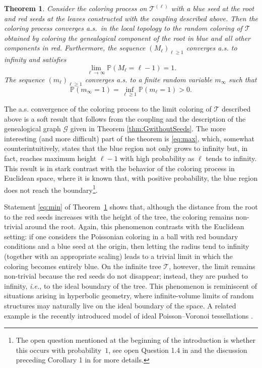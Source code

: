 \documentclass[french]{article}
\newtheorem{theorem}{Theorem}
\renewcommand{\P}{\mathbb{P}}
\newcommand{\T}{\mathcal{T}}
\renewcommand{\1}{\mathds{1}}
\begin{document}
\begin{theorem}\label{theo:main} Consider the coloring process on $\T^{(\ell)}$ with a blue seed at the root and red seeds at the leaves constructed with the coupling described above. Then the coloring process converges a.s.\ in the local topology to the random coloring of $\T$ obtained by coloring the genealogical component of the root in blue and all other components in red. Furthermore, the sequence $(M_\ell)_{\ell\ge 1}$ converges a.s. to infinity and satisfies
\begin{equation}\label{eq:max}
  \lim_{\ell\to \infty} \P(M_{\ell}=\ell-1)=1.  
\end{equation}
The sequence $(m_\ell)_{\ell\ge 1}$ converges a.s. to a finite random variable $m_\infty$ such that
\begin{equation}\label{eq:min}
   \P(m_\infty=1)=\inf_{\ell\ge 1} \P(m_\ell=1)>0.  
\end{equation} 
\end{theorem}

The a.s. convergence of the coloring process to the limit coloring of $\T$ described above is a soft result that follows from the coupling and the description of the genealogical graph $\mathcal{G}$ given in Theorem \ref{thm:GwithoutSeeds}. The more interesting (and more difficult) part of the theorem is \eqref{eq:max}, which, somewhat counterintuitively, states that the blue region not only grows to infinity but, in fact, reaches maximum height $\ell-1$ with high probability as $\ell$ tends to infinity. This result is in stark contrast with the behavior of the coloring process in Euclidean space, where it is known that, with positive probability, the blue region does not reach the boundary\footnote{The open question mentioned at the beginning of the introduction is whether this occurs with probability~$1$, see open Question 1.4 in \cite{BasdevantBlancCurienSingh} and the discussion preceding Corollary 1 in \cite{Preater2009} for more details.}.

\medskip 

Statement \eqref{eq:min} of Theorem~\ref{theo:main} shows that, although the distance from the root to the red seeds increases with the height of the tree, the coloring remains non-trivial around the root. Again, this phenomenon contrasts with the Euclidean setting: if one considers the Poissonian coloring in a ball with red boundary conditions and a blue seed at the origin, then letting the radius tend to infinity (together with an appropriate scaling) leads to a trivial limit in which the coloring becomes entirely blue. On the infinite tree $\T$, however, the limit remains non-trivial because the red seeds do not disappear; instead, they are pushed to infinity, \emph{i.e.}, to the ideal boundary of the tree. This phenomenon is reminiscent of situations arising in hyperbolic geometry, where infinite-volume limits of random structures may naturally live on the ideal boundary of the space. A related example is the recently introduced model of ideal Poisson--Voronoi tessellations \cite{dAchilleEtAl23}.
\end{document}
